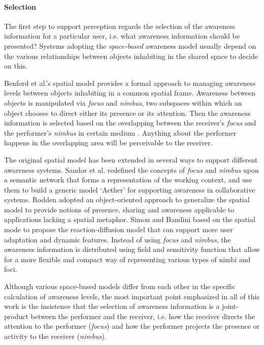 \paragraph*{Selection} %
\label{par:selection}
The first step to support perception regards the selection of the awareness information for a particular user, i.e. what awareness information should be presented? Systems adopting the \emph{space-based} awareness model usually depend on the various relationships between objects inhabiting in the shared space to decide on this.

Benford et al.'s spatial model \cite{Benford1993} provides a formal approach to managing awareness levels between objects inhabiting in a common spatial frame. Awareness between objects is manipulated via \emph{focus} and \emph{nimbus}, two subspaces within which an object chooses to direct either its presence or its attention. Then the awareness information is selected based on the overlapping between the receiver's \emph{focus} and the performer's \emph{nimbus} in certain medium \cite{Benford1993}. Anything about the performer happens in the overlapping area will be perceivable to the receiver. 

The original spatial model has been extended in several ways to support different awareness systems. Sandor et al. \cite{Sandor1997} redefined the concepts of \emph{focus} and \emph{nimbus} upon a semantic network that forms a representation of the working context, and use them to build a generic model `Aether' for supporting awareness in collaborative systems. Rodden \cite{Rodden1996} adopted an object-oriented approach to generalize the spatial model to provide notions of presence, sharing and awareness applicable to applications lacking a spatial metaphor. Simon and Bandini \cite{simone2002a} based on the spatial mode to propose the reaction-diffusion model that can support more user adaptation and dynamic features. Instead of using \emph{focus} and \emph{nimbus}, the awareness information is distributed using field and sensitivity function that allow for a more flexible and compact way of representing various types of nimbi and foci. 

Although various space-based models differ from each other in the specific calculation of awareness levels, the most important point emphasized in all of this work is the insistence that the selection of awareness information is a joint-product between the performer and the receiver, i.e. how the receiver directs the attention to the performer (\emph{focus}) and how the performer projects the presence or activity to the receiver (\emph{nimbus}).

